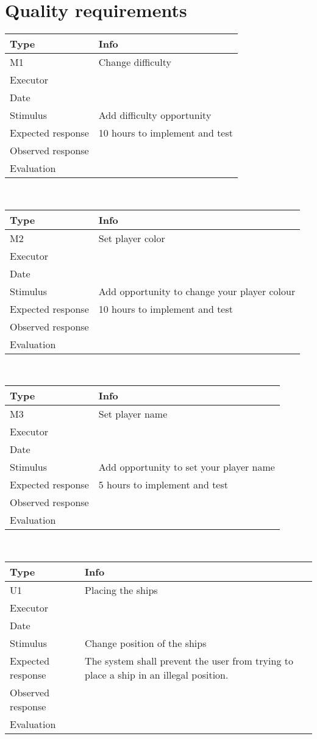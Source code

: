 \section{Quality requirements}
\begin{tabular}{|l|l|}
	\hline
	\bf{Type}	& \bf{Info} \\
	\hline
	M1			& Change difficulty \\
	Executor	&  \\
	Date		& \date{\today} \\
	Stimulus	& Add difficulty opportunity \\
	Expected response & 10 hours to implement and test \\
	Observed response & \\
	Evaluation	& \\
	\hline
\end{tabular}
\\
\begin{tabular}{|l|l|}
	\hline
	\bf{Type}	& \bf{Info} \\
	\hline
	M2			& Set player color \\
	Executor	&  \\
	Date		& \date{\today} \\
	Stimulus	& Add opportunity to change your player colour \\
	Expected response & 10 hours to implement and test\\
	Observed response & \\
	Evaluation	& \\
	\hline
\end{tabular}
\\
\begin{tabular}{|l|l|}
	\hline
	\bf{Type}	& \bf{Info} \\
	\hline
	M3			& Set player name \\
	Executor	&  \\
	Date		& \date{\today} \\
	Stimulus	& Add opportunity to set your player name \\
	Expected response & 5 hours to implement and test\\
	Observed response & \\
	Evaluation	&  \\
	\hline
\end{tabular}
\\
\begin{tabular}{|l|l|}
	\hline
	\bf{Type}	& \bf{Info} \\
	\hline
	U1			& Placing the ships \\
	Executor	&  \\
	Date		& \date{\today} \\
	Stimulus	& Change position of the ships \\
	Expected response & The system shall prevent the user from trying to place a ship in an illegal position.\\
	Observed response & \\
	Evaluation	&  \\
	\hline
\end{tabular}
